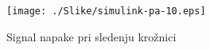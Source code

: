 \begin{figure}
	\centering
	\texttt{[image: ./Slike/simulink-pa-10.eps]}
	\caption{Signal napake pri sledenju kro\v{z}nici}
	\label{fig:simulink-pa-10}
\end{figure}
